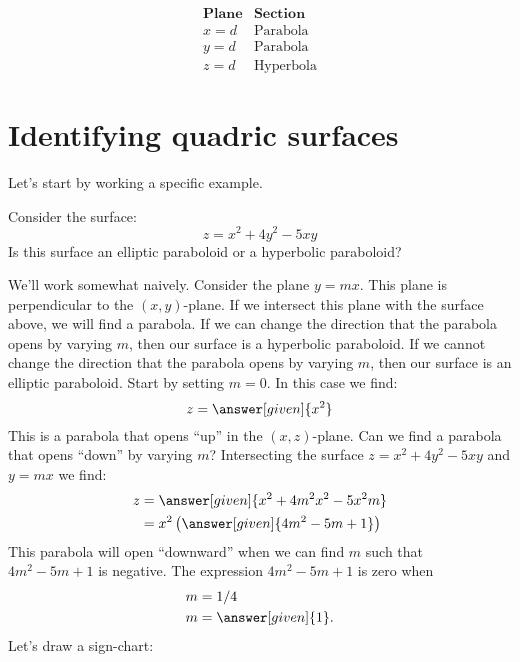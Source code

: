\documentclass{ximera}
\begin{document}
\[
\begin{array}{cc}
\textbf{Plane}  & \textbf{Section} \\ \hline
x=d & \text{Parabola}\\
y=d & \text{Parabola}\\
z=d & \text{Hyperbola}
\end{array}
\]

\section{Identifying quadric surfaces}

Let's start by working a specific example.

\begin{example}
  Consider the surface:
  \[
  z = x^2+4y^2-5xy
  \]
  Is this surface an elliptic paraboloid or a hyperbolic paraboloid?
  \begin{explanation}
    We'll work somewhat naively. Consider the plane $y= mx$. This
    plane is perpendicular to the $(x,y)$-plane. If we intersect this
    plane with the surface above, we will find a parabola. If we can
    change the direction that the parabola opens by varying $m$, then
    our surface is a hyperbolic paraboloid. If we cannot change the
    direction that the parabola opens by varying $m$, then our surface
    is an elliptic paraboloid. Start by setting $m = 0$. In this case
    we find:
    \[
    z = \answer[given]{x^2}
    \]
    This is a parabola that opens ``up'' in the $(x,z)$-plane. Can we
    find a parabola that opens ``down'' by varying $m$? Intersecting
    the surface $z = x^2 + 4y^2 -5xy$ and $y=mx$ we find:
    \begin{align*}
      z &= \answer[given]{x^2 + 4 m^2 x^2 -5 x^2 m}\\
      &=x^2\left(\answer[given]{4 m^2-5m + 1}\right)
    \end{align*}
    This parabola will open ``downward'' when we can find $m$ such
    that $4 m^2-5m + 1$ is negative. The expression $4 m^2-5m + 1$ is zero when
    \begin{align*}
      m &= 1/4\\
      m &= \answer[given]{1}.
    \end{align*}
    Let's draw a sign-chart:
    \begin{image}
\end{image}
\end{explanation}
\end{example}
\end{document}
